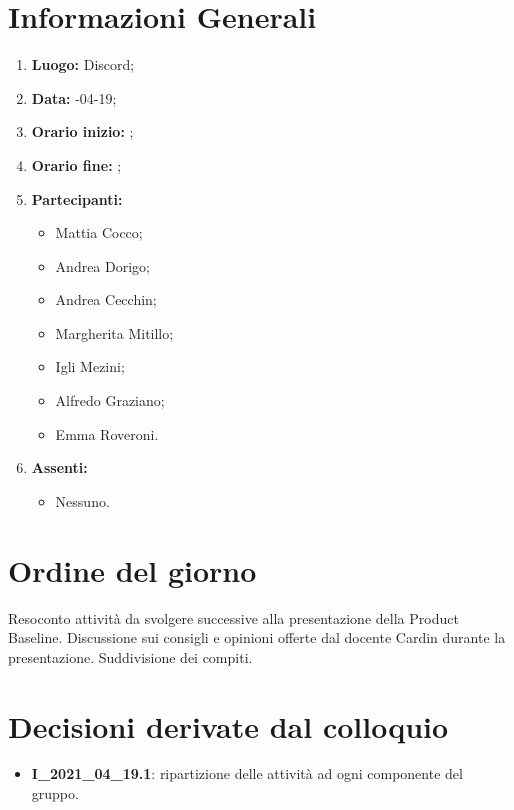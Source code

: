 \newpage
\section{Informazioni Generali}
\begin{enumerate}
	\item \textbf{Luogo:} \normalfont  Discord;
	\item \textbf{Data:} -04-19;
	\item \textbf{Orario inizio:} ;
	\item \textbf{Orario fine:} ;
	\item \textbf{Partecipanti:}
	\begin{itemize}
		\item Mattia Cocco;
		\item Andrea Dorigo;
		\item Andrea Cecchin;
		\item Margherita Mitillo;
		\item Igli Mezini;
		\item Alfredo Graziano;
		\item Emma Roveroni.
	\end{itemize}
	\item \textbf{Assenti:}
	\begin{itemize}
		\item Nessuno.
	\end{itemize}
\end{enumerate}
\section{Ordine del giorno}
Resoconto attività da svolgere successive alla presentazione della Product Baseline. Discussione sui consigli e opinioni offerte dal docente Cardin durante la presentazione. Suddivisione dei compiti. 

\section{Decisioni derivate dal colloquio}
\begin{itemize}
	\item \textbf{I\_2021\_04\_19.1}: ripartizione delle attività ad ogni componente del gruppo.
\end{itemize}